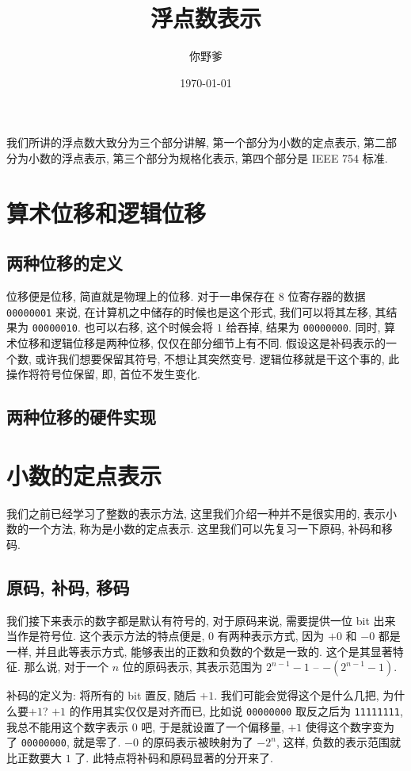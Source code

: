 \documentclass[12pt]{ctexart}
\theoremstyle{definition}
\theoremstyle{plain}
\begin{document}
\title{浮点数表示}
\author{你野爹}
\date{\today}
\maketitle
\tableofcontents

我们所讲的浮点数大致分为三个部分讲解, 第一个部分为小数的定点表示, 第二部分为小数的浮点表示, 第三个部分为规格化表示, 第四个部分是 IEEE 754 标准. 

\section{算术位移和逻辑位移}
\subsection{两种位移的定义}
位移便是位移, 简直就是物理上的位移. 对于一串保存在 8 位寄存器的数据 \texttt{00000001} 来说, 在计算机之中储存的时候也是这个形式, 我们可以将其左移, 其结果为 \texttt{00000010}. 也可以右移, 这个时候会将 \(1\) 给吞掉, 结果为 \texttt{00000000}. 同时, 算术位移和逻辑位移是两种位移, 仅仅在部分细节上有不同. 假设这是补码表示的一个数, 或许我们想要保留其符号, 不想让其突然变号. 逻辑位移就是干这个事的, 此操作将符号位保留, 即, 首位不发生变化. 
\subsection{两种位移的硬件实现}
\section{小数的定点表示}
我们之前已经学习了整数的表示方法, 这里我们介绍一种并不是很实用的, 表示小数的一个方法, 称为是小数的定点表示. 这里我们可以先复习一下原码, 补码和移码. 
\subsection{原码, 补码, 移码}
我们接下来表示的数字都是默认有符号的, 对于原码来说, 需要提供一位 bit 出来当作是符号位. 这个表示方法的特点便是, \(0\) 有两种表示方式, 因为 \(+0\) 和 \(-0\) 都是一样, 并且此等表示方式, 能够表出的正数和负数的个数是一致的. 这个是其显著特征. 
那么说, 对于一个 \(n\) 位的原码表示, 其表示范围为 \(2^{n-1} - 1\) -- \(-(2 ^{n-1} - 1)\).

补码的定义为: 将所有的 bit 置反, 随后 \(+1\). 我们可能会觉得这个是什么几把, 为什么要\(+1\)? \(+1\) 的作用其实仅仅是对齐而已, 比如说 \texttt{00000000} 取反之后为 \texttt{11111111}, 我总不能用这个数字表示 \(0\) 吧, 于是就设置了一个偏移量, \(+1\) 使得这个数字变为了 \texttt{00000000}, 就是零了. \(-0\) 的原码表示被映射为了 \(-2 ^{n}\), 这样, 负数的表示范围就比正数要大 \(1\) 了. 此特点将补码和原码显著的分开来了. 
\end{document}
